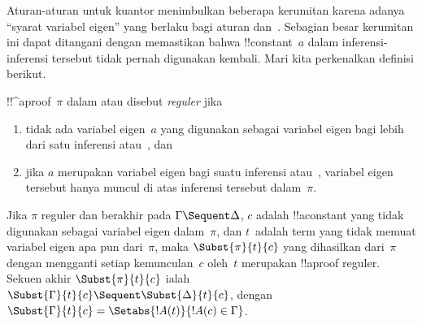\documentclass[../../../include/open-logic-section]{subfiles}
\begin{document}


Aturan-aturan untuk kuantor menimbulkan beberapa kerumitan karena adanya
``syarat variabel eigen'' yang berlaku bagi aturan \LeftR{\lexists}
dan~\RightR{\lforall}. Sebagian besar kerumitan ini dapat ditangani dengan
memastikan bahwa !!{constant}~$a$ dalam inferensi-inferensi tersebut tidak
pernah digunakan kembali. Mari kita perkenalkan definisi berikut.

\begin{defn}
!!^a{proof}~$\pi$ dalam  atau  disebut \emph{reguler} jika
\begin{enumerate}
  \item tidak ada variabel eigen~$a$ yang digunakan sebagai variabel eigen
  bagi lebih dari satu inferensi \LeftR{\lexists} atau~\RightR{\lforall}, dan
  \item jika $a$ merupakan variabel eigen bagi suatu inferensi
  \LeftR{\lexists} atau~\RightR{\lforall}, variabel eigen tersebut hanya muncul di atas
  inferensi tersebut dalam~$\pi$.
\end{enumerate}
\end{defn}

\begin{lem} Jika $\pi$ reguler dan berakhir pada
$\Gamma \Sequent \Delta$, $c$ adalah !!a{constant} yang tidak digunakan
sebagai variabel eigen dalam~$\pi$, dan $t$~adalah term yang tidak memuat
variabel eigen apa pun dari~$\pi$, maka $\Subst{\pi}{t}{c}$ yang dihasilkan
dari~$\pi$ dengan mengganti setiap kemunculan~$c$ oleh~$t$ merupakan
!!a{proof} reguler. Sekuen akhir $\Subst{\pi}{t}{c}$ ialah
$\Subst{\Gamma}{t}{c} \Sequent \Subst{\Delta}{t}{c}$, dengan
$\Subst{\Gamma}{t}{c} = \Setabs{!A(t)}{!A(c) \in \Gamma}$.
\end{lem}
\end{document}
